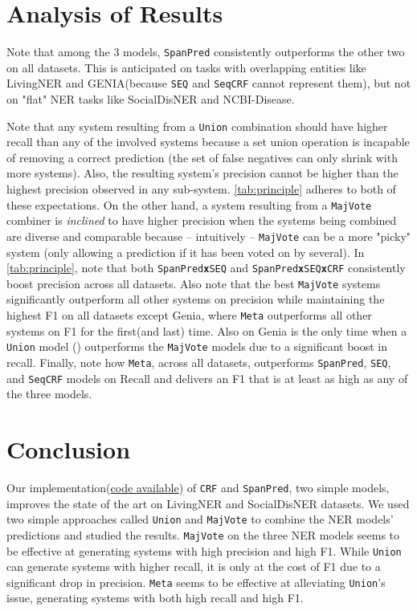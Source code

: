 \documentclass[11pt]{article}
\begin{document}
\section{Analysis of Results}
Note that among the 3 models, \texttt{SpanPred} consistently outperforms the other two on all datasets. This is anticipated on tasks with overlapping entities like LivingNER and GENIA(because \texttt{SEQ} and \texttt{SeqCRF} cannot represent them), but not on "flat" NER tasks like SocialDisNER and NCBI-Disease. \par
Note that any system resulting from a \texttt{Union} combination should have higher recall than any of the involved systems because a set union operation is incapable of removing a correct prediction (the set of false negatives can only shrink with more systems). Also, the resulting system's precision cannot be higher than the highest precision observed in any sub-system.   \autoref{tab:principle} adheres to both of these expectations. On the other hand, a system resulting from a \texttt{MajVote} combiner is \textit{inclined} to have higher precision when the systems being combined are diverse and comparable because -- intuitively --  \texttt{MajVote} can be a more "picky" system (only allowing a prediction if it has been voted on by several). In \autoref{tab:principle}, note that both \texttt{SpanPred\textbf{x}SEQ} and \texttt{SpanPred\textbf{x}SEQ\textbf{x}CRF} consistently boost precision across all datasets. Also note that the best \texttt{MajVote} systems significantly outperform all other systems on precision while maintaining the highest F1 on all datasets except Genia, where \texttt{Meta} outperforms all other systems on F1 for the first(and last) time. Also on Genia is the only time when a \texttt{Union} model () outperforms the \texttt{MajVote} models due to a significant boost in recall. Finally, note how \texttt{Meta}, across all datasets, outperforms \texttt{SpanPred}, \texttt{SEQ}, and \texttt{SeqCRF} models on Recall and delivers an F1 that is at least as high as any of the three models.\par

\section{Conclusion}
Our implementation(\href{https://github.com/flyingmothman/bionlp}{code available}) of \texttt{CRF} and \texttt{SpanPred}, two simple models, improves the state of the art on LivingNER and SocialDisNER datasets. We used two simple approaches called \texttt{Union} and \texttt{MajVote} to combine the NER models' predictions and studied the results. \texttt{MajVote} on the three NER models seems to be effective at generating systems with high precision and high F1. While \texttt{Union} can generate systems with higher recall, it is only at the cost of F1 due to a significant drop in precision. \texttt{Meta} seems to be effective at alleviating \texttt{Union}'s issue, generating systems with both high recall and high F1.







 
\end{document}

